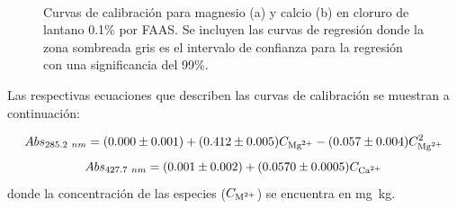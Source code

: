 \begin{figure}[H]
    \centering
    \\
    \caption[Curvas de calibración para magnesio y calcio por FAAS.]{Curvas de calibración para magnesio (a) y calcio (b) en cloruro de lantano 0.1\% por FAAS. Se incluyen las curvas de regresión donde la zona sombreada gris es el intervalo de confianza para la regresión con una significancia del 99\%.}
    \label{fig:MagCal}
\end{figure}

Las respectivas ecuaciones que describen las curvas de calibración se muestran a continuación:

\begin{equation}
    Abs_{285.2~nm}=(0.000\pm0.001)+(0.412\pm0.005) C_{\ce{Mg^2+}} - (0.057\pm0.004) C_{\ce{Mg^2+}}^2
\end{equation}
\begin{equation}
    Abs_{427.7~nm}=(0.001\pm0.002)+(0.0570\pm0.0005) C_{\ce{Ca^2+}}
\end{equation}
donde la concentración de las especies ($C_{\ce{M^2+}}$) se encuentra en mg~kg\mnn.

